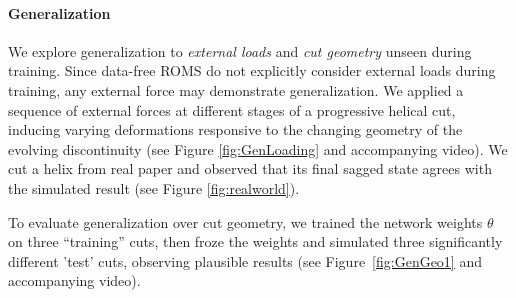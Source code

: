 
    

\paragraph{Generalization}
We explore generalization to 
\emph{external loads} and \emph{cut geometry} unseen during training.
Since data-free ROMS do not explicitly consider external loads during training, any external force may demonstrate generalization. We applied a sequence of external forces at different stages of a progressive helical cut, inducing varying deformations responsive to the changing geometry of the evolving discontinuity (see Figure \ref{fig:GenLoading} and accompanying video). We cut a helix from real paper and observed that its final sagged state agrees with the simulated result (see Figure \ref{fig:realworld}). 

To evaluate generalization over cut geometry, we trained the network weights $\theta$ on three ``training'' cuts, then froze the weights and simulated three significantly different 'test' cuts, observing plausible results (see Figure~\ref{fig:GenGeo1} and accompanying video).

